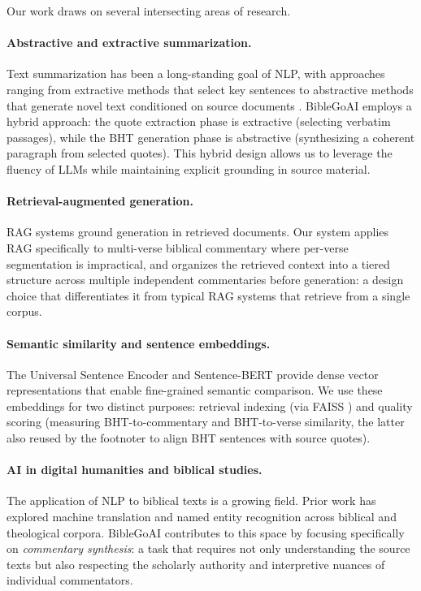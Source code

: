 Our work draws on several intersecting areas of research.

\paragraph{Abstractive and extractive summarization.}
Text summarization has been a long-standing goal of NLP, with approaches ranging from extractive methods that select key sentences \citep{devlin2019bert} to abstractive methods that generate novel text conditioned on source documents \citep{vaswani2017attention}. BibleGoAI employs a hybrid approach: the quote extraction phase is extractive (selecting verbatim passages), while the BHT generation phase is abstractive (synthesizing a coherent paragraph from selected quotes). This hybrid design allows us to leverage the fluency of LLMs while maintaining explicit grounding in source material.

\paragraph{Retrieval-augmented generation.}
RAG systems \citep{lewis2020rag} ground generation in retrieved documents. Our system applies RAG specifically to multi-verse biblical commentary where per-verse segmentation is impractical, and organizes the retrieved context into a tiered structure across multiple independent commentaries before generation: a design choice that differentiates it from typical RAG systems that retrieve from a single corpus.

\paragraph{Semantic similarity and sentence embeddings.}
The Universal Sentence Encoder \citep{cer2018use} and Sentence-BERT \citep{reimers2019sentencebert} provide dense vector representations that enable fine-grained semantic comparison. We use these embeddings for two distinct purposes: retrieval indexing (via FAISS \citep{johnson2019faiss}) and quality scoring (measuring BHT-to-commentary and BHT-to-verse similarity, the latter also reused by the footnoter to align BHT sentences with source quotes).

\paragraph{AI in digital humanities and biblical studies.}
The application of NLP to biblical texts is a growing field. Prior work has explored machine translation \citep{nllb2022translate} and named entity recognition across biblical and theological corpora. BibleGoAI contributes to this space by focusing specifically on \textit{commentary synthesis}: a task that requires not only understanding the source texts but also respecting the scholarly authority and interpretive nuances of individual commentators.

